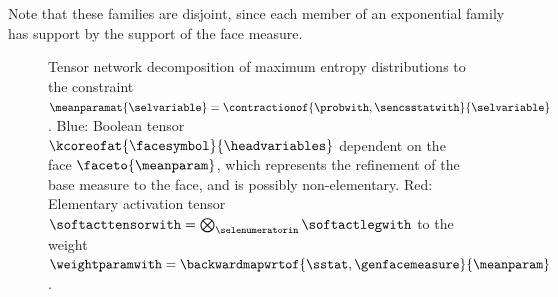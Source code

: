 Note that these families are disjoint, since each member of an exponential family has support by the support of the face measure.

\begin{figure}[t]
    \begin{center}
        
    \end{center}
    \caption{
        Tensor network decomposition of maximum entropy distributions to the constraint $\meanparamat{\selvariable}=\contractionof{\probwith,\sencsstatwith}{\selvariable}$.
        Blue: Boolean tensor $\kcoreofat{\facesymbol}{\headvariables}$ dependent on the face $\faceto{\meanparam}$, which represents the refinement of the base measure to the face, and is possibly non-elementary.
        Red: Elementary activation tensor $\softacttensorwith=\bigotimes_{\selenumeratorin}\softactlegwith$ to the weight $\weightparamwith= \backwardmapwrtof{\sstat,\genfacemeasure}{\meanparam}$.
    }\label{fig:maxEntropyActcore}
\end{figure}